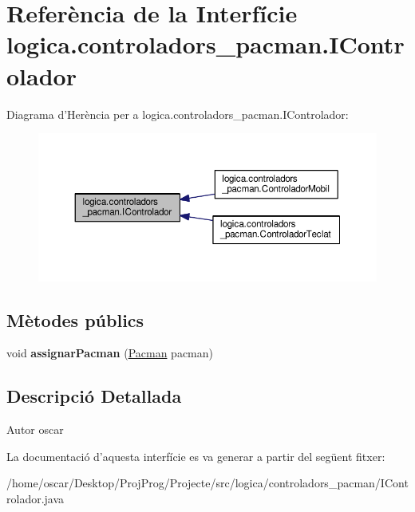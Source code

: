 \hypertarget{interfacelogica_1_1controladors__pacman_1_1_i_controlador}{\section{Referència de la Interfície logica.\+controladors\+\_\+pacman.\+I\+Controlador}
\label{interfacelogica_1_1controladors__pacman_1_1_i_controlador}
}


Diagrama d'Herència per a logica.\+controladors\+\_\+pacman.\+I\+Controlador\+:\nopagebreak
\begin{figure}[H]
\begin{center}
\leavevmode
\includegraphics[width=350pt]{interfacelogica_1_1controladors__pacman_1_1_i_controlador__inherit__graph}
\end{center}
\end{figure}
\subsection*{Mètodes públics}
\begin{DoxyCompactItemize}
\item 
\hypertarget{interfacelogica_1_1controladors__pacman_1_1_i_controlador_ac765182730a4337c576a9764cdd521fa}{void {\bfseries assignar\+Pacman} (\hyperlink{classlogica_1_1_pacman}{Pacman} pacman)}\label{interfacelogica_1_1controladors__pacman_1_1_i_controlador_ac765182730a4337c576a9764cdd521fa}

\end{DoxyCompactItemize}


\subsection{Descripció Detallada}
\begin{DoxyAuthor}{Autor}
oscar 
\end{DoxyAuthor}


La documentació d'aquesta interfície es va generar a partir del següent fitxer\+:\begin{DoxyCompactItemize}
\item 
/home/oscar/\+Desktop/\+Proj\+Prog/\+Projecte/src/logica/controladors\+\_\+pacman/I\+Controlador.\+java\end{DoxyCompactItemize}

